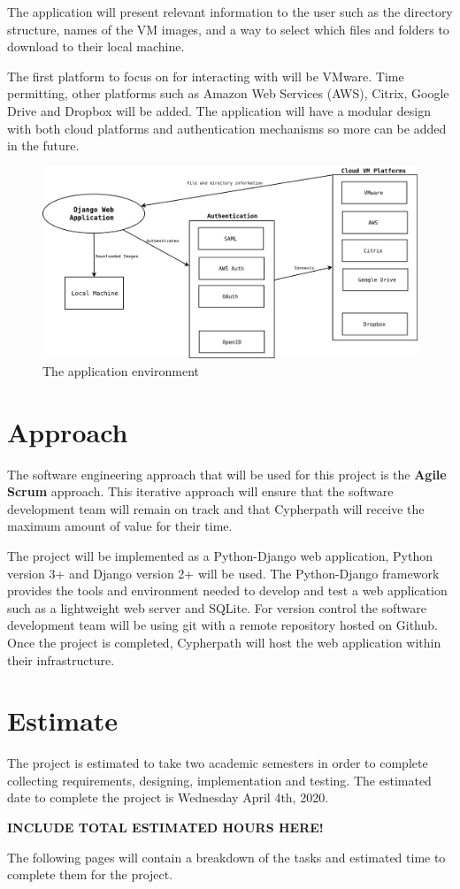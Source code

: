 \documentclass{article}
\begin{document}
    The application will present relevant information to the user such as the directory structure, names of the VM images, and a way to select which files and folders
    to download to their local machine.

    The first platform to focus on for interacting with will be VMware. Time permitting, other platforms such as Amazon Web Services (AWS), Citrix, Google Drive and Dropbox
    will be added. The application will have a modular design with both cloud platforms and authentication mechanisms so more can be added in the future.

    \begin{figure}[h]
    \includegraphics[scale=.7]{downloader_env}
        \caption{The application environment}
    \end{figure}

    \pagebreak
    \section{Approach}
    The software engineering approach that will be used for this project is the \textbf{Agile Scrum} approach.
    This iterative approach will ensure that the software development team will remain on track and that Cypherpath will receive the maximum amount of value
    for their time.

    The project will be implemented as a Python-Django web application, Python version 3+ and Django version 2+ will be used. The Python-Django framework provides the tools 
    and environment needed to develop and test a web application such as a lightweight web server and SQLite. For version control the software development team will be using git
    with a remote repository hosted on Github. Once the project is completed, Cypherpath will host the web application within their infrastructure.

    \section{Estimate}
    The project is estimated to take two academic semesters in order to complete collecting requirements, designing, implementation and testing. The estimated date
    to complete the project is Wednesday April 4th, 2020.

    \Huge \textbf{INCLUDE TOTAL ESTIMATED HOURS HERE!}

    The following pages will contain a breakdown of the tasks and estimated time to complete them for the project.
\end{document}
